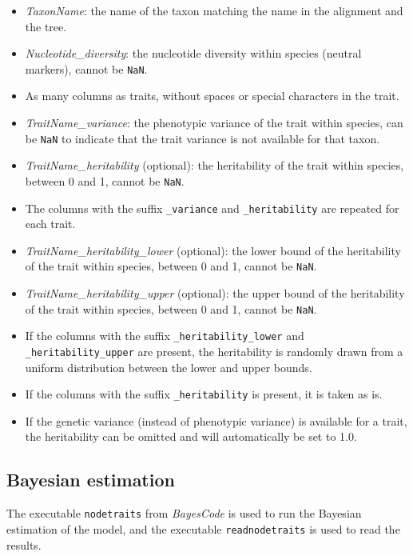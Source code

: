 \documentclass{article}
\begin{document}
\begin{itemize}
    \item \emph{TaxonName}: the name of the taxon matching the name in the alignment and the tree.
    \item \emph{Nucleotide\_diversity}: the nucleotide diversity within species (neutral markers), cannot be \texttt{NaN}.
    \item As many columns as traits, without spaces or special characters in the trait.
    \item \emph{TraitName\_variance}: the phenotypic variance of the trait within species, can be \texttt{NaN} to indicate that the trait variance is not available for that taxon.
    \item \emph{TraitName\_heritability} (optional): the heritability of the trait within species, between 0 and 1, cannot be \texttt{NaN}.
    \item The columns with the suffix \texttt{\_variance} and \texttt{\_heritability} are repeated for each trait.
    \item \emph{TraitName\_heritability\_lower} (optional): the lower bound of the heritability of the trait within species, between 0 and 1, cannot be \texttt{NaN}.
    \item \emph{TraitName\_heritability\_upper} (optional): the upper bound of the heritability of the trait within species, between 0 and 1, cannot be \texttt{NaN}.
    \item If the columns with the suffix \texttt{\_heritability\_lower} and \texttt{\_heritability\_upper} are present, the heritability is randomly drawn from a uniform distribution between the lower and upper bounds.
    \item If the columns with the suffix \texttt{\_heritability} is present, it is taken as is.
    \item If the genetic variance (instead of phenotypic variance) is available for a trait, the heritability can be omitted and will automatically be set to 1.0.
\end{itemize}

\subsection{Bayesian estimation}\label{subsec:running-nodetraitsand-readnodetraits}

The executable \texttt{nodetraits} from \textit{BayesCode} is used to run the Bayesian estimation of the model, and the executable \texttt{readnodetraits} is used to read the results.
\end{document}
